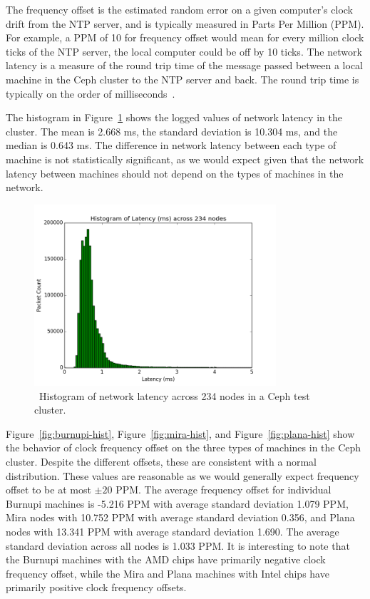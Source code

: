 The frequency offset is the estimated random error on a given computer's
clock drift from the NTP server, and is typically measured in Parts
Per Million (PPM). For example, a PPM of 10 for frequency offset would
mean for every million clock ticks of the NTP server, the local
computer could be off by 10 ticks. The network latency is a measure of
the round trip time of the message passed between a local machine in
the Ceph cluster to the NTP server and back. The round trip time
is typically on the order of milliseconds~\citep{Sage}.


The histogram in Figure~\ref{fig:latency-hist} shows the logged
values of network latency in the cluster. The mean is 2.668 ms, the 
standard deviation is 10.304 ms, and the median is 0.643 ms. The 
difference in network latency between each type of machine is not
statistically significant, as we would expect given that the network
latency between machines should not depend on the types of 
machines in the network. 

\begin{figure}[h]
  \centering
  \caption{~Histogram of network latency across 234 nodes in a Ceph test cluster.} 
  \label{fig:latency-hist}
  \includegraphics[width=0.8\textwidth]{latency-hist.png}
\end{figure}

Figure~\ref{fig:burnupi-hist}, Figure~\ref{fig:mira-hist},
and Figure~\ref{fig:plana-hist} show the behavior of clock frequency offset
on the three types of machines in the Ceph cluster. Despite the different offsets, 
these are consistent with a normal distribution. These values are reasonable 
as we would generally expect frequency offset to be at most $\pm 20$ PPM. 
The average frequency offset for individual Burnupi machines is -5.216 PPM with 
average standard deviation 1.079 PPM, Mira nodes with 10.752 PPM with average
standard deviation 0.356, and Plana nodes with 13.341 PPM with average standard deviation 1.690. The average standard deviation across all nodes is
1.033 PPM. It is interesting to note that the Burnupi machines with 
the AMD chips have primarily negative clock frequency offset, while the 
Mira and Plana machines with Intel chips have primarily positive 
clock frequency offsets.

